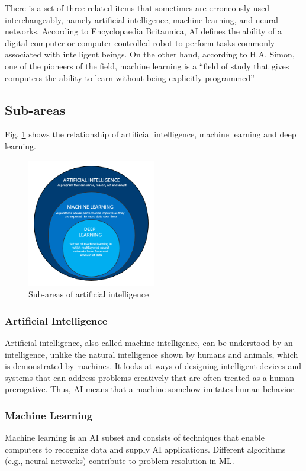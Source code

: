 There is a set of three related items that sometimes are erroneously used interchangeably, namely artificial intelligence, machine learning, and neural networks. According to Encyclopaedia Britannica, AI defines the ability of a digital computer or computer-controlled robot to perform tasks commonly associated with intelligent beings. On the other hand, according to H.A. Simon, one of the pioneers of the field, machine learning is a “field of study that gives computers the ability to learn without being explicitly programmed”

\subsection{Sub-areas}
Fig. \ref{fig:ai_taxonomy} shows the relationship of artificial intelligence, machine learning and deep learning.
\begin{figure}[htbp]
\centering
\includegraphics[width=0.5\textwidth]{./images/ai_taxonomy.png}
\caption{Sub-areas of artificial intelligence \parencite{Suman2020}}
\label{fig:ai_taxonomy}
\end{figure}

\subsubsection{Artificial Intelligence}
Artificial intelligence, also called machine intelligence, can be understood by an intelligence, unlike the natural intelligence shown by humans and animals, which is demonstrated by machines. It looks at ways of designing intelligent devices and systems that can address problems creatively that are often treated as a human prerogative. Thus, AI means that a machine somehow imitates human behavior.
\subsubsection{Machine Learning} 
Machine learning is an AI subset and consists of techniques that enable computers to recognize data and supply AI applications. Different algorithms (e.g., neural networks) contribute to problem resolution in ML.
